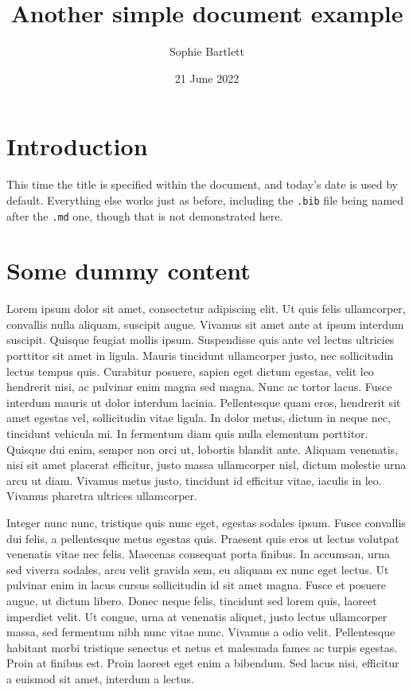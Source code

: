 \documentclass[11pt,a4paper]{article}
\title{Another simple document example}
\author{Sophie Bartlett}
\date{21 June 2022}
\begin{document}
\maketitle

\tableofcontents


\section{Introduction}

This time the title is specified within the document, and today's date is used
by default. Everything else works just as before, including the \verb|.bib| file
being named after the \verb|.md| one, though that is not demonstrated here.

\section{Some dummy content}

Lorem ipsum dolor sit amet, consectetur adipiscing elit. Ut quis felis
ullamcorper, convallis nulla aliquam, suscipit augue. Vivamus sit amet ante at
ipsum interdum suscipit. Quisque feugiat mollis ipsum. Suspendisse quis ante vel
lectus ultricies porttitor sit amet in ligula. Mauris tincidunt ullamcorper
justo, nec sollicitudin lectus tempus quis. Curabitur posuere, sapien eget
dictum egestas, velit leo hendrerit nisi, ac pulvinar enim magna sed magna. Nunc
ac tortor lacus. Fusce interdum mauris ut dolor interdum lacinia. Pellentesque
quam eros, hendrerit sit amet egestas vel, sollicitudin vitae ligula. In dolor
metus, dictum in neque nec, tincidunt vehicula mi. In fermentum diam quis nulla
elementum porttitor. Quisque dui enim, semper non orci ut, lobortis blandit
ante. Aliquam venenatis, nisi sit amet placerat efficitur, justo massa
ullamcorper nisl, dictum molestie urna arcu ut diam. Vivamus metus justo,
tincidunt id efficitur vitae, iaculis in leo. Vivamus pharetra ultrices
ullamcorper.

Integer nunc nunc, tristique quis nunc eget, egestas sodales ipsum. Fusce
convallis dui felis, a pellentesque metus egestas quis. Praesent quis eros ut
lectus volutpat venenatis vitae nec felis. Maecenas consequat porta finibus. In
accumsan, urna sed viverra sodales, arcu velit gravida sem, eu aliquam ex nunc
eget lectus. Ut pulvinar enim in lacus cursus sollicitudin id sit amet magna.
Fusce et posuere augue, ut dictum libero. Donec neque felis, tincidunt sed lorem
quis, laoreet imperdiet velit. Ut congue, urna at venenatis aliquet, justo
lectus ullamcorper massa, sed fermentum nibh nunc vitae nunc. Vivamus a odio
velit. Pellentesque habitant morbi tristique senectus et netus et malesuada
fames ac turpis egestas. Proin at finibus est. Proin laoreet eget enim a
bibendum. Sed lacus nisi, efficitur a euismod sit amet, interdum a lectus.
\end{document}
